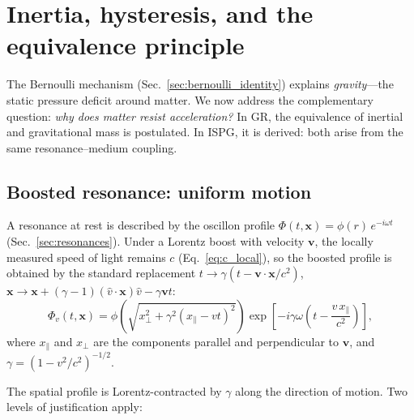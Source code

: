\documentclass[aps,prd,onecolumn,superscriptaddress,nofootinbib,showpacs,12pt,notitlepage]{revtex4-2}
\begin{document}
\section{Inertia, hysteresis, and the equivalence principle}
\label{sec:inertia}

The Bernoulli mechanism (Sec.~\ref{sec:bernoulli_identity})
explains \emph{gravity}---the static pressure deficit
around matter.  We now address the complementary
question: \emph{why does matter resist acceleration?}
In GR, the equivalence of inertial and gravitational mass
is postulated.  In ISPG, it is derived: both arise from
the same resonance--medium coupling.

\subsection{Boosted resonance: uniform motion}
\label{sec:uniform_motion}

A resonance at rest is described by the oscillon profile
$\Phi(t,\mathbf{x}) = \phi(r)\,e^{-i\omega t}$
(Sec.~\ref{sec:resonances}).  Under a Lorentz boost
with velocity $\mathbf{v}$, the locally measured speed
of light remains $c$ (Eq.~\ref{eq:c_local}), so the
boosted profile is obtained by the standard replacement
$t \to \gamma(t - \mathbf{v}\cdot\mathbf{x}/c^2)$,
$\mathbf{x} \to \mathbf{x} + (\gamma - 1)
(\hat{v}\cdot\mathbf{x})\hat{v} - \gamma\mathbf{v}t$:
\begin{equation}\label{eq:boosted_oscillon}
  \Phi_v(t,\mathbf{x})
  = \phi\!\left(\sqrt{x_\perp^2
    + \gamma^2(x_\parallel - vt)^2}\right)
    \exp\!\left[-i\gamma\omega
    \left(t - \frac{v\,x_\parallel}{c^2}\right)\right],
\end{equation}
where $x_\parallel$ and $x_\perp$ are the components
parallel and perpendicular to $\mathbf{v}$, and
$\gamma = (1 - v^2/c^2)^{-1/2}$.

The spatial profile is Lorentz-contracted by $\gamma$
along the direction of motion.  Two levels of
justification apply:
\end{document}
